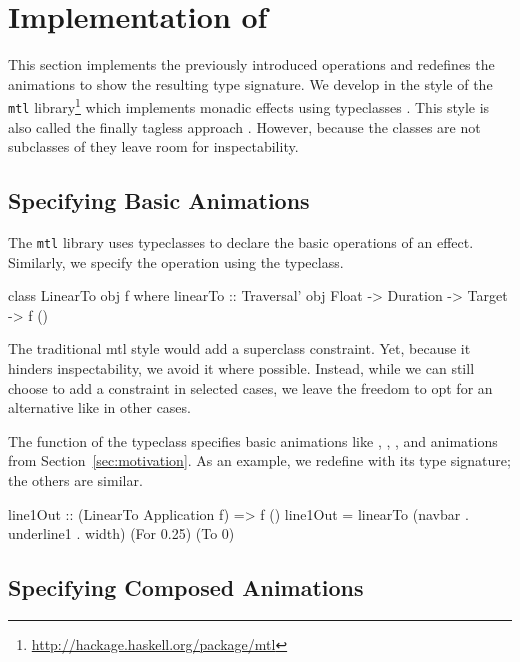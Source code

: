 \section{Implementation of \dsl{}}
\label{sec:detail}

This section implements the previously introduced operations and redefines the animations to show the resulting type signature. We
develop \dsl{} in the style of the \texttt{mtl}
library\footnote{\url{http://hackage.haskell.org/package/mtl}} which implements
monadic effects using typeclasses \cite{DBLP:conf/afp/Jones95}.  This style is
also called the finally tagless approach \cite{DBLP:journals/jfp/CaretteKS09}.
However, because the \dsl{} classes are not subclasses of  they leave
room for inspectability.

\subsection{Specifying Basic Animations}

The \texttt{mtl} library uses typeclasses to declare the basic operations of an
effect. Similarly, we specify the  operation using
the  typeclass.

\begin{code}
class LinearTo obj f where
  linearTo :: Traversal' obj Float -> Duration -> Target -> f ()
\end{code}

The traditional mtl style would add a  superclass constraint. Yet,
because it hinders inspectability, we avoid it where possible. Instead,
while we can still choose to add a  constraint in selected
cases, we leave the freedom to opt for an alternative like  in
other cases.

The  function of the  typeclass specifies basic
animations like , ,
, and  animations from
Section~\ref{sec:motivation}. 
As an example, we redefine  with its type signature; the others 
are similar. 

\begin{code}
line1Out :: (LinearTo Application f) => f ()
line1Out = linearTo (navbar . underline1 . width) (For 0.25) (To 0)
\end{code}

\subsection{Specifying Composed Animations}

